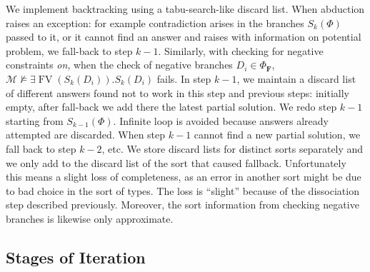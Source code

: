 \documentclass{article}
\newcommand{\tmem}[1]{{\em #1\/}}
\newcommand{\tmmathbf}[1]{\ensuremath{\boldsymbol{#1}}}
\newcommand{\tmop}[1]{\ensuremath{\operatorname{#1}}}
\newcommand{\tmverbatim}[1]{{\ttfamily{#1}}}
\begin{document}
We implement backtracking using a tabu-search-like discard list. When
abduction raises an exception: for example contradiction arises in the
branches $S_k (\Phi)$ passed to it, or it cannot find an answer and raises
\tmverbatim{Suspect} with information on potential problem, we fall-back to
step $k - 1$. Similarly, with checking for negative constraints {\tmem{on}},
when the check of negative branches $D_i \in \Phi_{\tmmathbf{F}}$, \
$\mathcal{M} \nvDash \exists \tmop{FV} (S_k (D_i)) .S_k (D_i)$ fails. In step
$k - 1$, we maintain a discard list of different answers found not to work in
this step and previous steps: initially empty, after fall-back we add there
the latest partial solution. We redo step $k - 1$ starting from $S_{k - 1}
(\Phi)$. Infinite loop is avoided because answers already attempted are
discarded. When step $k - 1$ cannot find a new partial solution, we fall back
to step $k - 2$, etc. We store discard lists for distinct sorts separately and
we only add to the discard list of the sort that caused fallback.
Unfortunately this means a slight loss of completeness, as an error in another
sort might be due to bad choice in the sort of types. The loss is ``slight''
because of the dissociation step described previously. Moreover, the sort
information from checking negative branches is likewise only approximate.

\subsection{Stages of Iteration}
\end{document}
